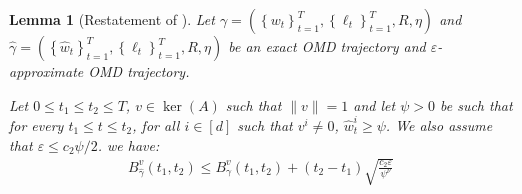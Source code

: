 \documentclass[10pt]{article}
\newtheorem*{lemma*}{Lemma}
\theoremstyle{definition}
\theoremstyle{remark}
\renewcommand{\epsilon}{\varepsilon}
\newcommand{\curly}[1]{ {\left\{ #1 \right\}}}
\newcommand{\barconst}{\nu}
\begin{document}
\begin{lemma*}[Restatement of ]
Let $\gamma=(\curly{w_t}_{t=1}^T, \curly{\ell_t}_{t=1}^T, R, \eta)$ and $\hat{\gamma}=(\curly{\hat{w}_t}_{t=1}^T, \curly{\ell_t}_{t=1}^T, R, \eta)$ be an exact OMD trajectory and $\epsilon$-approximate OMD trajectory.

Let $0\le t_1\le t_2 \le T$, $v\in \ker(A)$ such that $\|v\|=1$ and let $\psi>0$ be such that for every $t_1\le t \le t_2$, for all $i\in[d]$ such that $v^i\ne 0$, $\hat{w}_t^i \ge \psi$. We also assume that $\epsilon \le c_2\psi/2$. we have:
\begin{align*}
    B_{\hat{\gamma}}^v(t_1,t_2) \le B_{\gamma}^v(t_1,t_2)  + (t_2-t_1)\sqrt{\frac{c_2\epsilon}{\psi^\barconst}}
\end{align*}
\end{lemma*}
\end{document}
